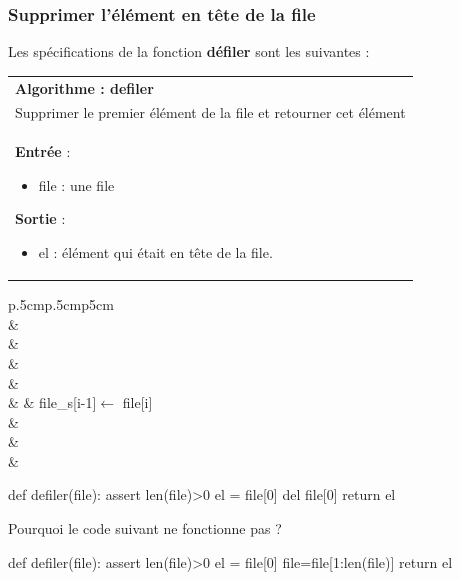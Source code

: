 \documentclass[10pt,fleqn]{article} %
\begin{document}
\subsubsection{Supprimer l'élément en tête de la file}
Les spécifications de la fonction \textbf{défiler} sont les suivantes :

\begin{tabular}{p{\linewidth}}
\hline
\textbf{Algorithme : defiler} \\
Supprimer le premier élément de la file et retourner cet élément\\
\hline
\textbf{Entrée} : 
\begin{itemize}
\item file : une file
\end{itemize}
\textbf{Sortie} : 
\begin{itemize}
\item el : élément qui était en tête de la file.
\end{itemize} \\
\hline 
\end{tabular}

\vspace{.5cm}

\noindent \begin{minipage}[c]{.48\linewidth}
\begin{pseudo}
\begin{tabular}{p{.5cm}p{.5cm}p{5cm}}
\hline
{}  \\
& \\
& \\
& \\
& \\
& & file\_s[i-1]$\leftarrow$ file[i]\\
& \\
& \\
& \\

\hline
\end{tabular}
\end{pseudo}
\end{minipage}\hfill
\begin{minipage}[c]{.48\linewidth}
\begin{py}
\begin{python}
def defiler(file):
    assert len(file)>0
    el = file[0]
    del file[0]
    return el
\end{python}
\end{py}
\end{minipage}
\begin{rem}
Pourquoi le code suivant ne fonctionne pas ?
\begin{python}
def defiler(file):
    assert len(file)>0
    el = file[0]
    file=file[1:len(file)]
    return el
\end{python}
\end{rem}
\end{document}
